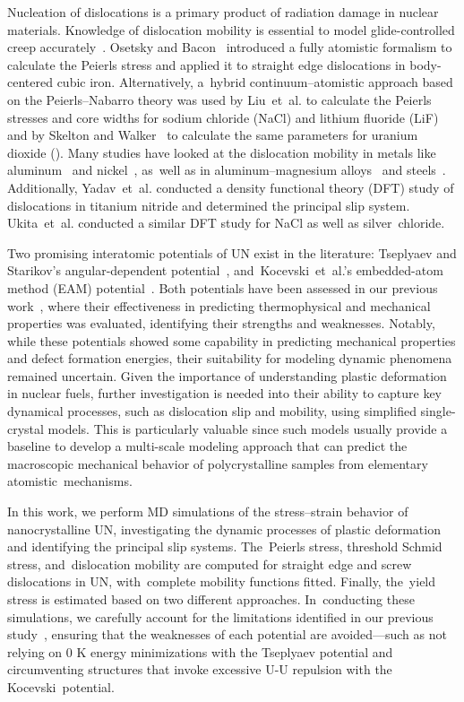 \documentclass[applsci,article,accept,pdftex,moreauthors]{Definitions/mdpi}
\newcommand{\?}{\stackrel{?}{=}}
\begin{document}
Nucleation of dislocations is a primary product of radiation damage in nuclear materials. Knowledge of dislocation mobility is essential to model glide-controlled creep accurately~\cite{Skelton2017}. Osetsky and Bacon~\cite{Osetsky2003} introduced a fully atomistic formalism to calculate the Peierls stress and applied it to straight edge dislocations in body-centered cubic iron. Alternatively, a~hybrid continuum--atomistic approach based on the Peierls--Nabarro theory was used by Liu~et~al. \cite{Liu2012} to calculate the Peierls stresses and core widths for sodium chloride (NaCl) and lithium fluoride (LiF) and by Skelton and Walker~\cite{Skelton2017} to calculate the same parameters for uranium dioxide (). Many studies have looked at the dislocation mobility in metals like aluminum~\cite{Cho2017, Dang2019} and nickel~\cite{Olmsted2005}, as~well as in aluminum--magnesium alloys~\cite{Olmsted2005} and steels~\cite{Kaloni2023}. Additionally, Yadav~et~al. \cite{Yadav2014} conducted a density functional theory (DFT) study of dislocations in titanium nitride and determined the principal slip system. Ukita~et~al. \cite{Ukita2018} conducted a similar DFT study for NaCl as well as silver~chloride.

Two promising interatomic potentials of UN exist in the literature: Tseplyaev and Starikov's angular-dependent potential~\cite{Tseplyaev2016}, and~Kocevski~et~al.'s embedded-atom method (EAM) potential~\cite{Kocevski2022II}. Both potentials have been assessed in our previous work~\cite{AbdulHameed2024}, where their effectiveness in predicting thermophysical and mechanical properties was evaluated, identifying their strengths and weaknesses. Notably, while these potentials showed some capability in predicting mechanical properties and defect formation energies, their suitability for modeling dynamic phenomena remained uncertain. Given the importance of understanding plastic deformation in nuclear fuels, further investigation is needed into their ability to capture key dynamical processes, such as dislocation slip and mobility, using simplified single-crystal models. This is particularly valuable since such models usually provide a baseline to develop a multi-scale modeling approach that can predict the macroscopic mechanical behavior of polycrystalline samples from elementary atomistic~mechanisms.

In this work, we perform MD simulations of the stress--strain behavior of nanocrystalline UN, investigating the dynamic processes of plastic deformation and identifying the principal slip systems. The~Peierls stress, threshold Schmid stress, and~dislocation mobility are computed for straight edge and screw dislocations in UN, with~complete mobility functions fitted. Finally, the~yield stress is estimated based on two different approaches. In~conducting these simulations, we carefully account for the limitations identified in our previous study~\cite{AbdulHameed2024}, ensuring that the weaknesses of each potential are avoided---such as not relying on 0 K energy minimizations with the Tseplyaev potential and circumventing structures that invoke excessive U-U repulsion with the Kocevski~potential.
\end{document}
